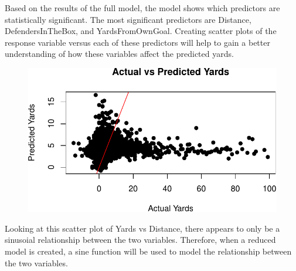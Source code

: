 \documentclass[
  super,
  preprint,
  3p]{elsarticle}
\newenvironment{Shaded}{\begin{snugshade}}{\end{snugshade}}
\newcommand{\AttributeTok}[1]{\textcolor[rgb]{0.40,0.45,0.13}{#1}}
\newcommand{\CommentTok}[1]{\textcolor[rgb]{0.37,0.37,0.37}{#1}}
\newcommand{\DecValTok}[1]{\textcolor[rgb]{0.68,0.00,0.00}{#1}}
\newcommand{\FunctionTok}[1]{\textcolor[rgb]{0.28,0.35,0.67}{#1}}
\newcommand{\NormalTok}[1]{\textcolor[rgb]{0.00,0.23,0.31}{#1}}
\newcommand{\SpecialCharTok}[1]{\textcolor[rgb]{0.37,0.37,0.37}{#1}}
\newcommand{\StringTok}[1]{\textcolor[rgb]{0.13,0.47,0.30}{#1}}
\begin{document}
Based on the results of the full model, the model shows which predictors
are statistically significant. The most significant predictors are
Distance, DefendersInTheBox, and YardsFromOwnGoal. Creating scatter
plots of the response variable versus each of these predictors will help
to gain a better understanding of how these variables affect the
predicted yards.

\begin{Shaded}
\end{Shaded}

\begin{figure}[H]

{\centering \includegraphics{project_report_files/figure-pdf/unnamed-chunk-10-1.pdf}

}

\end{figure}

Looking at this scatter plot of Yards vs Distance, there appears to only
be a sinusoial relationship between the two variables. Therefore, when a
reduced model is created, a sine function will be used to model the
relationship between the two variables.

\begin{Shaded}
\end{Shaded}
\end{document}
